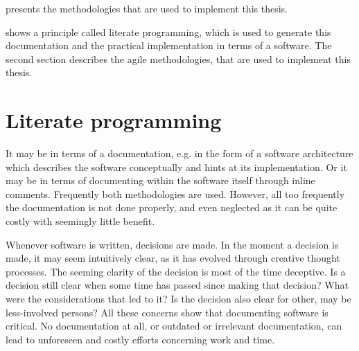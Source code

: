 \documentclass[%
    a4paper,    %
    justified,  %
    nobib,      %
    openany     %
]{tufte-book}
\begin{document}
 presents the methodologies that are used to implement
this thesis.

 shows a principle called literate
programming, which is used to generate this documentation and the practical
implementation in terms of a software. The second section describes the agile
methodologies, that are used to implement this thesis.

\section{Literate programming}
\label{sec:literate-programming}

 It may be in terms of
a documentation, e.g. in the form of a software architecture which
describes the software conceptually and hints at its implementation. Or it may
be in terms of documenting within the software itself through inline comments.
Frequently both methodologies are used. However, all too
frequently the documentation is not done properly, and even neglected as it can
be quite costly with seemingly little benefit.

 Whenever software is written,
decisions are made. In the moment a decision is made, it may seem intuitively
clear, as it has evolved through creative thought processes. The seeming clarity
of the decision is most of the time deceptive. Is a decision still clear when
some time has passed since making that decision? What were the considerations
that led to it? Is the decision also clear for other, may be less-involved
persons? All these concerns show that documenting software is critical. No
documentation at all, or outdated or irrelevant documentation, can lead to
unforeseen and costly efforts concerning work and time.
\end{document}
